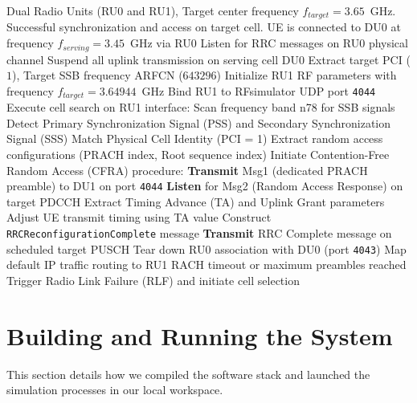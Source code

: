 \begin{algorithm}[H]
\caption{UE Frequency-Switching Loop} \label{alg:ue_ho}
\begin{algorithmic}[1]
\Require Dual Radio Units (RU0 and RU1), Target center frequency $f_{target} = 3.65$~GHz.
\Ensure Successful synchronization and access on target cell.
\State UE is connected to DU0 at frequency $f_{serving} = 3.45$~GHz via RU0
\State Listen for RRC messages on RU0 physical channel
    \State Suspend all uplink transmission on serving cell DU0
    \State Extract target PCI ($1$), Target SSB frequency ARFCN ($643296$)
    \State Initialize RU1 RF parameters with frequency $f_{target} = 3.64944$~GHz
    \State Bind RU1 to RFsimulator UDP port \texttt{4044}
    \State Execute cell search on RU1 interface:
    \Repeat
        \State Scan frequency band n78 for SSB signals
        \State Detect Primary Synchronization Signal (PSS) and Secondary Synchronization Signal (SSS)
        \State Match Physical Cell Identity (PCI = 1)
    \State Extract random access configurations (PRACH index, Root sequence index)
    \State Initiate Contention-Free Random Access (CFRA) procedure:
    \State \textbf{Transmit} Msg1 (dedicated PRACH preamble) to DU1 on port \texttt{4044}
    \State \textbf{Listen} for Msg2 (Random Access Response) on target PDCCH
        \State Extract Timing Advance (TA) and Uplink Grant parameters
        \State Adjust UE transmit timing using TA value
        \State Construct \texttt{RRCReconfigurationComplete} message
        \State \textbf{Transmit} RRC Complete message on scheduled target PUSCH
        \State Tear down RU0 association with DU0 (port \texttt{4043})
        \State Map default IP traffic routing to RU1
        \State {}
    \Else
        \State RACH timeout or maximum preambles reached
        \State Trigger Radio Link Failure (RLF) and initiate cell selection
        \State {}
    \EndIf
\EndIf
\end{algorithmic}
\end{algorithm}

\section{Building and Running the System}
\justify
This section details how we compiled the software stack and launched the simulation processes in our local workspace.

